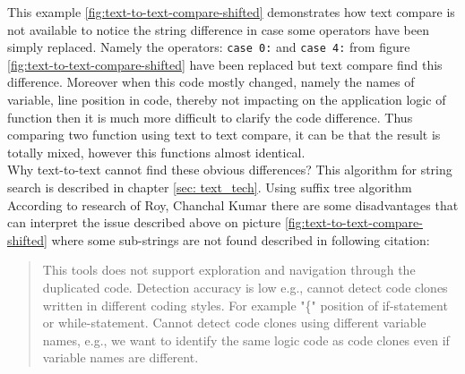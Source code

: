 \documentclass{report}
\begin{document}
This example \ref{fig:text-to-text-compare-shifted} demonstrates how text compare is not available to notice the string difference in case some operators have been simply replaced. Namely the operators: \texttt{case 0:} and \texttt{case 4:} from figure \ref{fig:text-to-text-compare-shifted} have been replaced but text compare find this difference. Moreover when this code mostly changed, namely the names of variable, line position in code, thereby not impacting on the application logic of function then it is much more difficult to clarify the code difference. Thus comparing two function using text to text compare, it can be that the result is totally mixed, however this functions almost identical.
\\
Why text-to-text cannot find these obvious differences? This algorithm for string search is described in chapter \ref{sec: text_tech}. Using suffix tree algorithm  According to research of Roy, Chanchal Kumar \cite{software_clone_detection} there are some disadvantages that can interpret the issue described above on picture \ref{fig:text-to-text-compare-shifted} where some sub-strings are not found described in following citation:
\begin{quote} 
This tools does not support exploration and navigation through the duplicated code. Detection accuracy is low e.g., cannot detect code clones written in different coding styles. For example "\{" position of if-statement or while-statement. Cannot detect code clones using different variable names, e.g., we want to identify the same logic code as code clones even if variable names are different\cite{software_clone_detection}. 
\end{quote}
\end{document}
